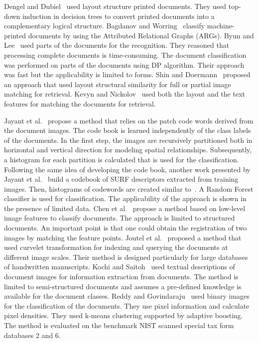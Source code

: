 Dengel and Dubiel~\cite{doclass_Dengel95} used layout structure printed documents. They used top-down induction in decision trees to convert printed documents into a complementary logical structure.
Bagdanov and Worring~\cite{doclass_Bagdanov2001} classify machine-printed documents by using the Attributed Relational Graphs (ARGs).
Byun and Lee~\cite{doclass_Byun2000} used parts of the documents for the recognition. They reasoned that processing complete documents is time-consuming. The document classification was performed on parts of the documents using DP algorithm. Their approach was fast but the applicability is limited to forms. Shin and Doermann~\cite{doclass_shin} proposed an approach that used layout structural similarity for full or partial image matching for retrieval. 
Kevyn and Nickolov~\cite{Collins-thompson02aclustering-based} used both the layout and the text features for matching the documents for retrieval. 

Jayant et al.~\cite{doclass_Kumar12} propose a method that relies on the patch code words derived from the document images. The code book is learned independently of the class labels of the documents. In the first step, the images are recursively partitioned both in horizontal and vertical direction for modeling spatial relationships. Subsequently, a histogram for each partition is calculated that is used for the classification.
Following the same idea of developing the code book, another work presented by Jayant et al.~\cite{doclass_Kumar14} build a codebook of SURF descriptors extracted from training images. Then, histograms of codewords are created similar to~\cite{doclass_Kumar12}. A Random Forest classifier is used for classification. The applicability of the approach is shown in the presence of limited data.
Chen et al.~\cite{doclass_Chen12} propose a method based on low-level image features to classify documents. The approach is limited to structured documents. An important point is that one could obtain the registration of two images by matching the feature points.
Joutel et al.~\cite{doclass_Joutel2007} proposed a method that used curvelet transformation for indexing and querying the documents at different image scales. Their method is designed particularly for large databases of handwritten manuscripts. Kochi and Saitoh~\cite{doclass_Kochi99} used textual descriptions of document images for information extraction from documents. The method is limited to semi-structured documents and assumes a pre-defined knowledge is available for the document classes.
Reddy and Govindaraju~\cite{doclass_umamaheswara08} used binary images for the classification of the documents. They use pixel information and calculate pixel densities.  They used k-means clustering supported by adaptive boosting. The method is evaluated on the benchmark NIST scanned special tax form databases $2$ and $6$.

